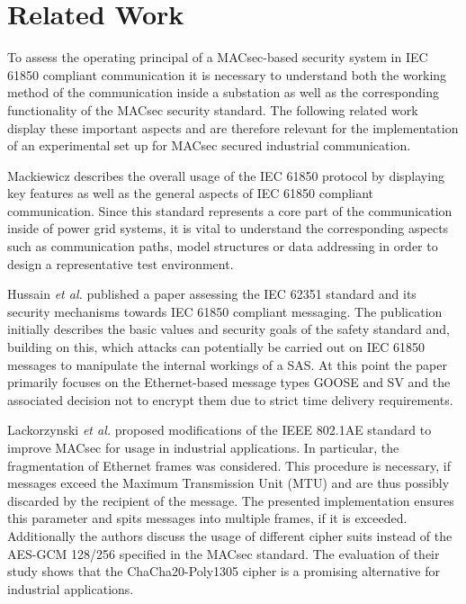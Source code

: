 \documentclass[conference, onecolumn, a4paper]{IEEEtran}
\begin{document}
\section{Related Work}
\label{chapter:relatedWork}
\noindent To assess the operating principal of a MACsec-based security system in IEC 61850 compliant communication it is necessary to understand both 
the working method of the communication inside a substation as well as the corresponding functionality of the MACsec security standard. The following 
related work display these important aspects and are therefore relevant for the implementation of an experimental set up for MACsec secured industrial 
communication.

\smallskip
Mackiewicz \cite{IEC61850_Overview:2006} describes the overall usage of the IEC 61850 protocol by displaying key features as well as the general aspects 
of IEC 61850 compliant communication. Since this standard represents a core part of the communication inside of power grid systems, it is vital to 
understand the corresponding aspects such as communication paths, model structures or data addressing in order to design a representative test environment. 

\smallskip
Hussain  \textit{et al.} \cite{Review_IEC62351:2019} published a paper assessing the IEC 62351 standard and its security mechanisms towards IEC 61850 
compliant messaging. The publication initially describes the basic values and security goals of the safety standard and, building on this, which attacks 
can potentially be carried out on IEC 61850 messages to manipulate the internal workings of a SAS. At this point the paper primarily focuses on the 
Ethernet-based message types GOOSE and SV and the associated decision not to encrypt them due to strict time delivery requirements.  

\smallskip
Lackorzynski \textit{et al.} \cite{MACsecIndustrialOptimization:2020} proposed modifications of the IEEE 802.1AE standard to improve MACsec for usage 
in industrial applications. In particular, the fragmentation of Ethernet frames was considered. This procedure is necessary, if messages exceed the 
Maximum Transmission Unit (MTU) and are thus possibly discarded by the recipient of the message. The presented implementation ensures this parameter 
and spits messages into multiple frames, if it is exceeded. Additionally the authors discuss the usage of different cipher suits instead of the 
AES-GCM 128/256 specified in the MACsec standard. The evaluation of their study shows that the ChaCha20-Poly1305 cipher is a promising alternative 
for industrial applications.
\end{document}
